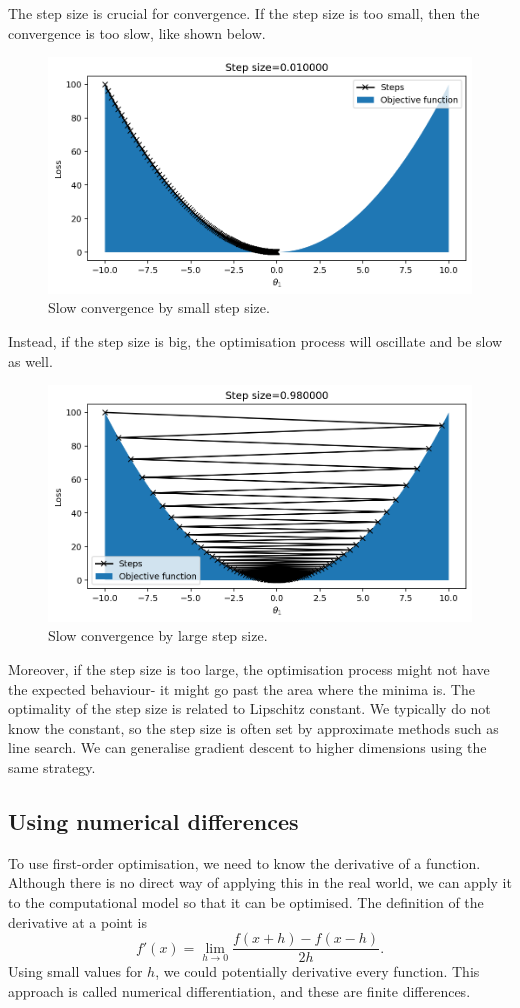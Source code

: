 \documentclass[a4paper, openany]{memoir}
\begin{document}
The step size is crucial for convergence. If the step size is too small, then the convergence is too slow, like shown below.
\begin{figure}[H]
    \centering
    \includegraphics[scale=0.4]{src/4.26 stepsize 0.01.png}
    \caption{Slow convergence by small step size.}
\end{figure}
\noindent Instead, if the step size is big, the optimisation process will oscillate and be slow as well.
\begin{figure}[H]
    \centering
    \includegraphics[scale=0.4]{src/4.27 stepsize 0.98.png}
    \caption{Slow convergence by large step size.}
\end{figure}
\noindent Moreover, if the step size is too large, the optimisation process might not have the expected behaviour- it might go past the area where the minima is. The optimality of the step size is related to Lipschitz constant. We typically do not know the constant, so the step size is often set by approximate methods such as line search. We can generalise gradient descent to higher dimensions using the same strategy.

\subsection{Using numerical differences}
To use first-order optimisation, we need to know the derivative of a function. Although there is no direct way of applying this in the real world, we can apply it to the computational model so that it can be optimised. The definition of the derivative at a point is
\[f'(x) = \lim_{h \to 0} \frac{f(x+h) - f(x-h)}{2h}.\]
Using small values for $h$, we could potentially derivative every function. This approach is called numerical differentiation, and these are finite differences.
\end{document}
